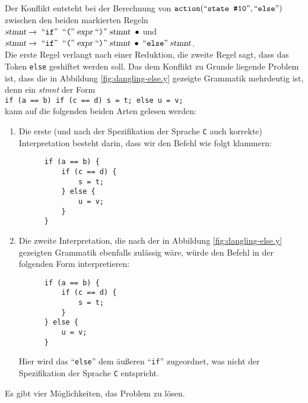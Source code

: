 Der Konflikt entsteht bei der Berechnung von
 $\texttt{action}(\mbox{``\texttt{state \#10}''}, \mbox{``\texttt{else}''})$ zwischen den
beiden markierten Regeln
\\[0.2cm]
\hspace*{1.3cm}
$\textsl{stmnt} \rightarrow \;\mbox{``\texttt{if}''}\; \;\mbox{``\texttt{(}''}\; \textsl{expr} \;\mbox{``\texttt{)}''}\; \textsl{stmnt}\;\; \bullet$ 
\quad und
\\[0.2cm]
\hspace*{1.3cm}
$\textsl{stmnt} \rightarrow 
\;\mbox{``\texttt{if}''}\; \;\mbox{``\texttt{(}''}\; \textsl{expr} \;\mbox{``\texttt{)}''}\; \textsl{stmnt} \;\bullet \;\mbox{``\texttt{else}''}\; \textsl{stmnt}$.
\\[0.2cm]
Die erste Regel verlangt nach einer Reduktion, die zweite Regel sagt, dass das Token 
\texttt{else} geshiftet werden soll.  Das dem Konflikt zu Grunde liegende Problem ist, dass die in Abbildung
\ref{fig:dangling-else.y} gezeigte Grammatik mehrdeutig ist, denn ein \textsl{stmnt} der Form
\\[0.2cm]
\hspace*{1.3cm}
\texttt{if (a == b) if (c == d) s = t; else u = v;}
\\[0.2cm]
kann auf die folgenden beiden Arten gelesen werden:
\begin{enumerate}
\item Die erste (und nach der Spezifikation der Sprache \texttt{C} auch korrekte) Interpretation 
      besteht darin, dass wir den Befehl wie folgt klammern:
      \begin{verbatim}
      if (a == b) {
          if (c == d) {
              s = t; 
          } else {
              u = v;
          }
      }
      \end{verbatim}
      \vspace*{-0.7cm}
\item Die zweite Interpretation, die nach der in Abbildung
      \ref{fig:dangling-else.y} gezeigten Grammatik ebenfalls zul\"assig w\"are,
      w\"urde den Befehl in der folgenden Form interpretieren:
      \begin{verbatim}
      if (a == b) {
          if (c == d) {
              s = t; 
          }
      } else {
          u = v;
      }
      \end{verbatim}
      \vspace*{-0.5cm}

      Hier wird das ``\texttt{else}'' dem \"au{\ss}eren ``\texttt{if}'' zugeordnet, was nicht der
      Spezifikation der Sprache \texttt{C} entspricht. 
\end{enumerate}
Es gibt vier M\"oglichkeiten, das Problem zu l\"osen.
